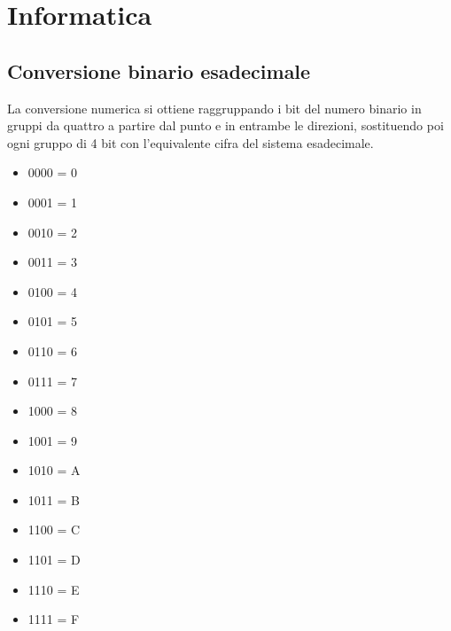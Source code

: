 \section{Informatica}
\subsection{Conversione binario esadecimale}
La conversione numerica si ottiene raggruppando i bit del numero binario in gruppi da quattro a partire dal punto e in entrambe le direzioni, sostituendo poi ogni gruppo di 4 bit con l'equivalente cifra del sistema esadecimale.
\begin{multicols}{4}
\begin{itemize}
    \item 0000 = 0
    \item 0001 = 1
    \item 0010 = 2
    \item 0011 = 3
    \item 0100 = 4
    \item 0101 = 5
    \item 0110 = 6
    \item 0111 = 7
    \item 1000 = 8
    \item 1001 = 9
    \item 1010 = A
    \item 1011 = B
    \item 1100 = C
    \item 1101 = D
    \item 1110 = E
    \item 1111 = F
\end{itemize}
\end{multicols}
